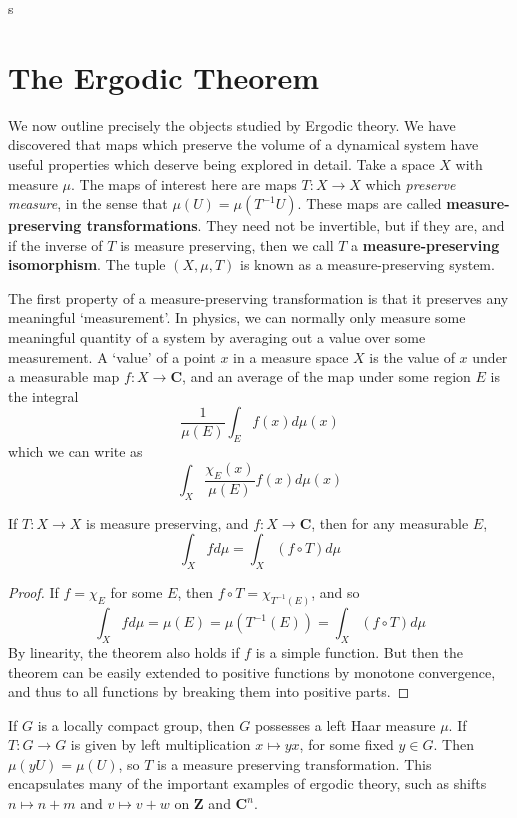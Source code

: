 s

\chapter{The Ergodic Theorem}

We now outline precisely the objects studied by Ergodic theory. We have discovered that maps which preserve the volume of a dynamical system have useful properties which deserve being explored in detail. Take a space $X$ with measure $\mu$. The maps of interest here are maps $T: X \to X$ which {\it preserve measure}, in the sense that $\mu(U) = \mu(T^{-1}U)$. These maps are called {\bf measure-preserving transformations}. They need not be invertible, but if they are, and if the inverse of $T$ is measure preserving, then we call $T$ a {\bf measure-preserving isomorphism}. The tuple $(X,\mu,T)$ is known as a measure-preserving system.

The first property of a measure-preserving transformation is that it preserves any meaningful `measurement'. In physics, we can normally only measure some meaningful quantity of a system by averaging out a value over some measurement. A `value' of a point $x$ in a measure space $X$ is the value of $x$ under a measurable map $f: X \to \mathbf{C}$, and an average of the map under some region $E$ is the integral
%
\[ \frac{1}{\mu(E)} \int_E f(x) d\mu(x) \]
%
which we can write as
%
\[ \int_X \frac{\chi_E(x)}{\mu(E)} f(x) d\mu(x) \]

\begin{theorem}
    If $T: X \to X$ is measure preserving, and $f: X \to \mathbf{C}$, then for any measurable $E$,
    \[ \int_X f d \mu = \int_X (f \circ T) d\mu \]
\end{theorem}
\begin{proof}
    If $f = \chi_E$ for some $E$, then $f \circ T = \chi_{T^{-1}(E)}$, and so
    \[ \int_X f d \mu = \mu(E) = \mu(T^{-1}(E)) = \int_X (f \circ T) d\mu \]
    By linearity, the theorem also holds if $f$ is a simple function. But then the theorem can be easily extended to positive functions by monotone convergence, and thus to all functions by breaking them into positive parts.
\end{proof}

\begin{example}
    If $G$ is a locally compact group, then $G$ possesses a left Haar measure $\mu$. If $T: G \to G$ is given by left multiplication $x \mapsto yx$, for some fixed $y \in G$. Then $\mu(yU) = \mu(U)$, so $T$ is a measure preserving transformation. This encapsulates many of the important examples of ergodic theory, such as shifts $n \mapsto n + m$ and $v \mapsto v + w$ on $\mathbf{Z}$ and $\mathbf{C}^n$.
\end{example}

